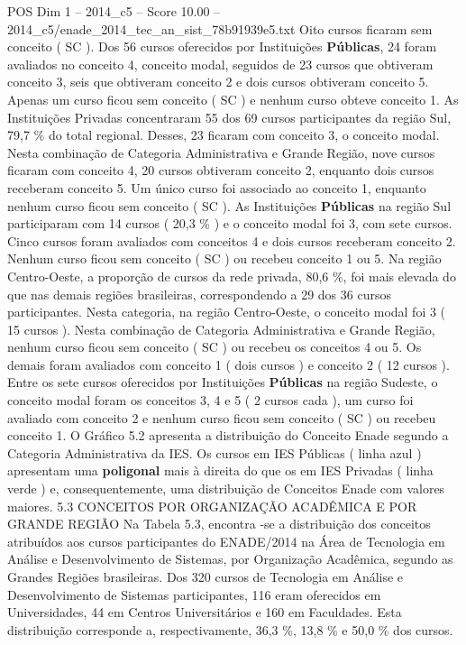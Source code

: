 \begin{textsample}{POS Dim 1 – 2014\_c5 – Score 10.00 – 2014\_c5/enade\_2014\_tec\_an\_sist\_78b91939e5.txt}
Oito cursos ficaram sem conceito ( SC ).
Dos 56 cursos oferecidos por Instituições \textbf{Públicas}, 24 foram avaliados no conceito 4, conceito modal, seguidos de 23 cursos que obtiveram conceito 3, seis que obtiveram conceito 2 e dois cursos obtiveram conceito 5.
Apenas um curso ficou sem conceito ( SC ) e nenhum curso obteve conceito 1.
As Instituições Privadas concentraram 55 dos 69 cursos participantes da região Sul, 79,7 \% do total regional.
Desses, 23 ficaram com conceito 3, o conceito modal.
Nesta combinação de Categoria Administrativa e Grande Região, nove cursos ficaram com conceito 4, 20 cursos obtiveram conceito 2, enquanto dois cursos receberam conceito 5.
Um único curso foi associado ao conceito 1, enquanto nenhum curso ficou sem conceito ( SC ).
As Instituições \textbf{Públicas} na região Sul participaram com 14 cursos ( 20,3 \% ) e o conceito modal foi 3, com sete cursos.
Cinco cursos foram avaliados com conceitos 4 e dois cursos receberam conceito 2.
Nenhum curso ficou sem conceito ( SC ) ou recebeu conceito 1 ou 5.
Na região Centro-Oeste, a proporção de cursos da rede privada, 80,6 \%, foi mais elevada do que nas demais regiões brasileiras, correspondendo a 29 dos 36 cursos participantes.
Nesta categoria, na região Centro-Oeste, o conceito modal foi 3 ( 15 cursos ).
Nesta combinação de Categoria Administrativa e Grande Região, nenhum curso ficou sem conceito ( SC ) ou recebeu os conceitos 4 ou 5.
Os demais foram avaliados com conceito 1 ( dois cursos ) e conceito 2 ( 12 cursos ).
Entre os sete cursos oferecidos por Instituições \textbf{Públicas} na região Sudeste, o conceito modal foram os conceitos 3, 4 e 5 ( 2 cursos cada ), um curso foi avaliado com conceito 2 e nenhum curso ficou sem conceito ( SC ) ou recebeu conceito 1.
O Gráfico 5.2 apresenta a distribuição do Conceito Enade segundo a Categoria Administrativa da IES.
Os cursos em IES Públicas ( linha azul ) apresentam uma \textbf{poligonal} mais à direita do que os em IES Privadas ( linha verde ) e, consequentemente, uma distribuição de Conceitos Enade com valores maiores. 5.3 CONCEITOS POR ORGANIZAÇÃO ACADÊMICA E POR GRANDE REGIÃO Na Tabela 5.3, encontra -se a distribuição dos conceitos atribuídos aos cursos participantes do ENADE/2014 na Área de Tecnologia em Análise e Desenvolvimento de Sistemas, por Organização Acadêmica, segundo as Grandes Regiões brasileiras.
Dos 320 cursos de Tecnologia em Análise e Desenvolvimento de Sistemas participantes, 116 eram oferecidos em Universidades, 44 em Centros Universitários e 160 em Faculdades.
Esta distribuição corresponde a, respectivamente, 36,3 \%, 13,8 \% e 50,0 \% dos cursos.

\end{textsample}
